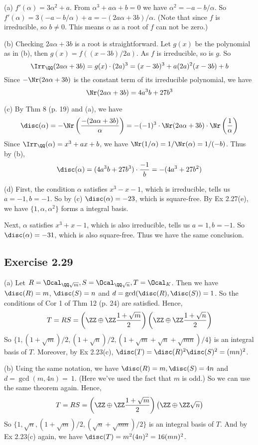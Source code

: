 \documentclass[../Chapter.tex]{subfiles}
\begin{document}
(a) $f'(\alpha)=3\alpha^2+a$. From $\alpha^3+a\alpha+b=0$ we have $\alpha^2=-a-b/\alpha$. So $f'(\alpha)=3(-a-b/\alpha)+a=-(2a\alpha+3b)/\alpha$. (Note that since $f$ is irreducible, so $b\neq 0$. This means $\alpha$ as a root of $f$ can not be zero.)

(b) Checking $2a\alpha+3b$ is a root is straightforward. Let $g(x)$ be the polynomial as in (b), then $g(x)=f((x-3b)/2a)$. As $f$ is irreducible, so is $g$. So $$\Irr_\QQ(2a\alpha+3b)=g(x)\cdot (2a)^3=(x-3b)^3+a(2a)^2(x-3b)+b$$ Since $-\Nr(2a\alpha+3b)$ is the constant term of its irreducible polynomial, we have $$\Nr(2a\alpha+3b)=4a^3b+27b^3$$

(c) By Thm 8 (p. 19) and (a), we have $$\disc(\alpha)=-\Nr\left(\frac{-(2a\alpha+3b)}{\alpha}\right)=-(-1)^3\cdot\Nr(2a\alpha+3b)\cdot\Nr\left(\frac{1}{\alpha}\right)$$ Since $\Irr_\QQ(\alpha)=x^3+ax+b$, we have $\Nr(1/\alpha)=1/\Nr(\alpha)=1/(-b)$. Thus by (b), $$\disc(\alpha)=(4a^3b+27b^3)\cdot\frac{-1}{b}=-(4a^3+27b^2)$$

(d) First, the condition $\alpha$ satisfies $x^3-x-1$, which is irreducible, tells us $a=-1,b=-1$. So by (c) $\disc(\alpha)=-23$, which is square-free. By Ex 2.27(e), we have $\{1,\alpha,\alpha^2\}$ forms a integral basis.

Next, $\alpha$ satisfies $x^3+x-1$, which is also irreducible, tells us $a=1,b=-1$. So $\disc(\alpha)=-31$, which is also square-free. Thus we have the same conclusion.

\subsection*{Exercise 2.29}

(a) Let $R=\Ocal_{\QQ\sqrt{m}},S=\Ocal_{\QQ\sqrt{n}},T=\Ocal_K$. Then we have $\disc(R)=m$, $\disc(S)=n$ and $d=\gcd(\disc(R),\disc(S))=1$. So the conditions of Cor 1 of Thm 12 (p. 24) are satisfied. Hence, $$T=RS=\left(\ZZ\oplus\ZZ\frac{1+\sqrt{m}}{2}\right)\left(\ZZ\oplus\ZZ\frac{1+\sqrt{n}}{2}\right)$$ So $\{1,(1+\sqrt{m})/2,(1+\sqrt{n})/2,(1+\sqrt{m}+\sqrt{n}+\sqrt{mn})/4\}$ is an integral basis of $T$. Moreover, by Ex 2.23(c), $\disc(T)=\disc(R)^2\disc(S)^2=(mn)^2$.  

(b) Using the same notation, we have $\disc(R)=m,\disc(S)=4n$ and $d=\gcd(m,4n)=~1$. (Here we've used the fact that $m$ is odd.) So we can use the same theorem again. Hence, $$T=RS=\left(\ZZ\oplus\ZZ\frac{1+\sqrt{m}}{2}\right)\left(\ZZ\oplus\ZZ\sqrt{n}\right)$$ So $\{1,\sqrt{n},(1+\sqrt{m})/2,(\sqrt{n}+\sqrt{mn})/2\}$ is an integral basis of $T$. And by Ex 2.23(c) again, we have $\disc(T)=m^2(4n)^2=16(mn)^2$.
\end{document}
